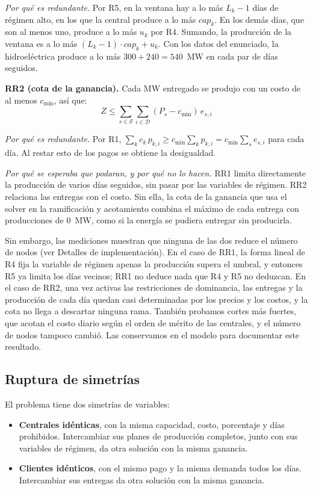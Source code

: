 \textit{Por qué es redundante.} Por R5, en la ventana hay a lo más $L_k - 1$ días de régimen alto, en los que la central produce a lo más $\mathit{cap}_k$. En los demás días, que son al menos uno, produce a lo más $u_k$ por R4. Sumando, la producción de la ventana es a lo más $(L_k - 1) \cdot \mathit{cap}_k + u_k$. Con los datos del enunciado, la hidroeléctrica produce a lo más $300 + 240 = 540$~MW en cada par de días seguidos.

\textbf{RR2 (cota de la ganancia).} Cada MW entregado se produjo con un costo de al menos $c_{\min}$, así que:
\[
    Z \le \sum_{s \in \mathcal{S}} \sum_{i \in \mathcal{D}} (P_s - c_{\min}) \, e_{s,i}
\]

\textit{Por qué es redundante.} Por R1, $\sum_k c_k \, p_{k,i} \ge c_{\min} \sum_k p_{k,i} = c_{\min} \sum_s e_{s,i}$ para cada día. Al restar esto de los pagos se obtiene la desigualdad.

\textit{Por qué se esperaba que podaran, y por qué no lo hacen.} RR1 limita directamente la producción de varios días seguidos, sin pasar por las variables de régimen. RR2 relaciona las entregas con el costo. Sin ella, la cota de la ganancia que usa el solver en la ramificación y acotamiento combina el máximo de cada entrega con producciones de 0~MW, como si la energía se pudiera entregar sin producirla.

Sin embargo, las mediciones muestran que ninguna de las dos reduce el número de nodos (ver Detalles de implementación). En el caso de RR1, la forma lineal de R4 fija la variable de régimen apenas la producción supera el umbral, y entonces R5 ya limita los días vecinos; RR1 no deduce nada que R4 y R5 no deduzcan. En el caso de RR2, una vez activas las restricciones de dominancia, las entregas y la producción de cada día quedan casi determinadas por los precios y los costos, y la cota no llega a descartar ninguna rama. También probamos cortes más fuertes, que acotan el costo diario según el orden de mérito de las centrales, y el número de nodos tampoco cambió. Las conservamos en el modelo para documentar este resultado.

\subsection{Ruptura de simetrías}

El problema tiene dos simetrías de variables:

\begin{itemize}
    \item \textbf{Centrales idénticas}, con la misma capacidad, costo, porcentaje y días prohibidos. Intercambiar sus planes de producción completos, junto con sus variables de régimen, da otra solución con la misma ganancia.
    \item \textbf{Clientes idénticos}, con el mismo pago y la misma demanda todos los días. Intercambiar sus entregas da otra solución con la misma ganancia.
\end{itemize}

